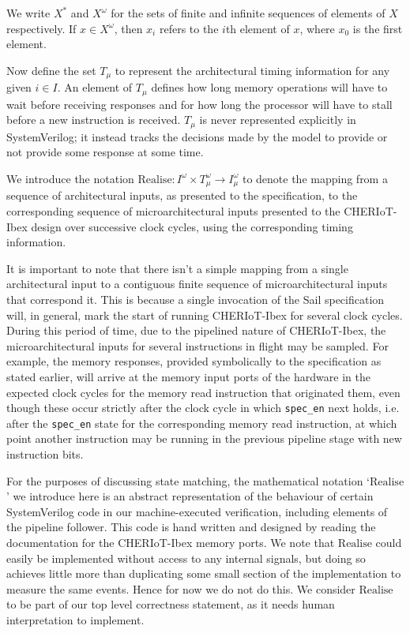 \documentclass[10pt,conference]{IEEEtran}
\begin{document}
We write $X^*$ and $X^\omega$ for the sets of finite and
infinite sequences of elements of $X$ respectively. If $x \in X^\omega$,
then $x_i$ refers to the $i$th element of $x$, where $x_0$ is the first
element.

Now define the set $T_\mu$ to represent the architectural timing
information for any given $i \in I$. An element of $T_\mu$ defines how long
memory operations will have to wait before receiving responses and for how
long the processor will have to stall before a new instruction is
received. $T_\mu$ is never represented explicitly in SystemVerilog; it
instead tracks the decisions made by the model to provide or not provide
some response at some time.

We introduce the notation $\mathrm{Realise} : I^\omega \times T_\mu^\omega \to I_\mu^\omega$
to denote the mapping from a sequence of architectural inputs, as
presented to the specification, to the corresponding sequence of
microarchitectural inputs presented to the CHERIoT-Ibex design over 
successive clock cycles, using the corresponding timing information.

It is important to note that there isn't a simple mapping from a single
architectural input to a contiguous finite sequence of microarchitectural
inputs that correspond it.  This is because a single invocation of the Sail
specification will, in general, mark the start of running CHERIoT-Ibex for
several clock cycles. During this period of time, due to the pipelined
nature of CHERIoT-Ibex, the microarchitectural inputs for several
instructions in flight may be sampled. For example, the memory responses,
provided symbolically to the specification as stated earlier, will
arrive at the memory input ports of the hardware in the expected clock
cycles for the memory read instruction that originated them,
even though these occur strictly after the clock cycle in which \verb|spec_en| next
holds, i.e. after the \verb|spec_en| state for the corresponding memory read
instruction, at which point another instruction may be running in the
previous pipeline stage with new instruction bits.

For the purposes of discussing state matching, the mathematical
notation `$\mathrm{Realise}$' we introduce here is an abstract representation of the
behaviour of certain SystemVerilog code in our machine-executed
verification, including elements of the pipeline follower. This code is
hand written and designed by reading the documentation for the CHERIoT-Ibex
memory ports. We note that $\mathrm{Realise}$ could easily be implemented
without access to any internal signals, but doing so achieves little more
than duplicating some small section of the implementation to measure the
same events. Hence for now we do not do this. We consider
$\mathrm{Realise}$ to be part of our top level correctness statement, as
it needs human interpretation to implement.
\end{document}
